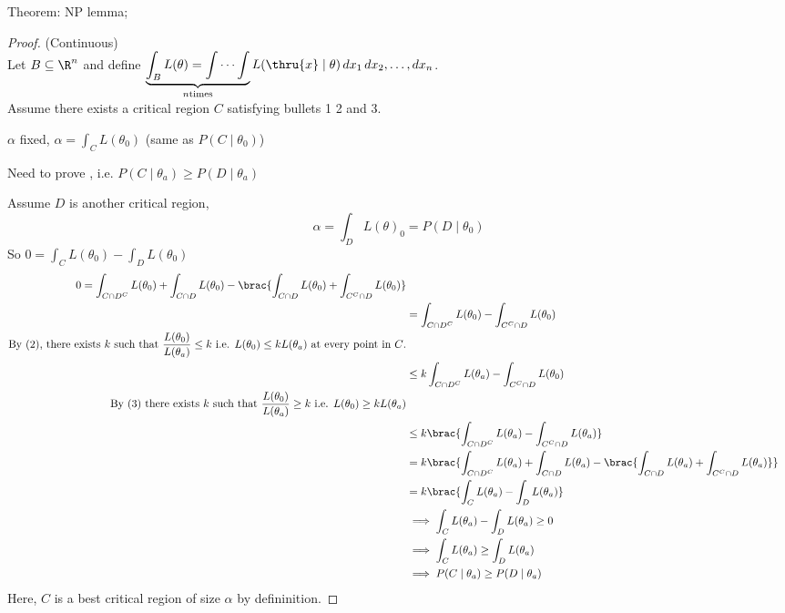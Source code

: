 Theorem: NP lemma;
\begin{proof} (Continuous)\\
    Let $B \subseteq \R^n$ and define $\displaystyle \underbrace{\int_B L(\theta) = \int \cdots \int}_{n \text{times}} L(\thru{x} \mid \theta) \, dx_1\, dx_2, \dots, dx_n  $.\\
    Assume there exists a critical region $C$ satisfying bullets 1 2 and 3.

    \nl $\alpha$ fixed, $\alpha = \int_C L(\theta_0)$ (same as $P(C \mid \theta_0)$)

    \nl Need to prove , i.e. $P(C \mid \theta_a) \geq P(D \mid \theta_a)$

    \nl Assume $D$ is another critical region,
    $$\alpha = \int_D L(\theta)_0 = P(D\mid \theta_0)$$
    So $\displaystyle 0 = \int_C L(\theta_0) - \int_D L(\theta_0) $
    \begin{align*}0 = \int_{C \cap D^C} L(\theta_0) + \int_{C \cap D} L(\theta_0) - \brac{ \int_{C \cap D} L(\theta_0) + \int_{C^C \cap D} L(\theta_0) }\\
        &= \int_{C \cap D^C} L(\theta_0) - \int_{C^C \cap D} L(\theta_0)\\
    \text{By (2), there exists $k$ such that $\dfrac{L(\theta_0)}{L(\theta_a)} \leq k$ i.e. $L(\theta_0) \leq kL(\theta_a)$ at every point in $C$.}\\
    & \leq k \int_{C \cap D^C} L(\theta_a) - \int_{C^C \cap D} L(\theta_0)\\
    \text{By (3) there exists $k$ such that $\dfrac{L(\theta_0)}{L(\theta_a)} \geq k$ i.e.  $L(\theta_0) \geq kL(\theta_a)$}\\
    & \leq k \brac{\int_{C \cap D^C} L(\theta_a) - \int_{C^C \cap D} L(\theta_a)}\\
    &= k \brac{\int_{C \cap D^C} L(\theta_a) + \int_{C \cap D} L(\theta_a) - \brac{ \int_{C \cap D} L(\theta_a) + \int_{C^C \cap D} L(\theta_a) }}\\
    &= k \brac{\int_C L(\theta_a) - \int_D L(\theta_a)}\\
    & \implies \int_C L(\theta_a) - \int_D L(\theta_a) \geq 0\\
    & \implies \int_C L(\theta_a) \geq \int_D L(\theta_a)\\
    & \implies P(C \mid \theta_a) \geq P(D \mid \theta_a)
    \end{align*}
    Here, $C$ is a best critical region of size $\alpha$ by defininition.
\end{proof}

